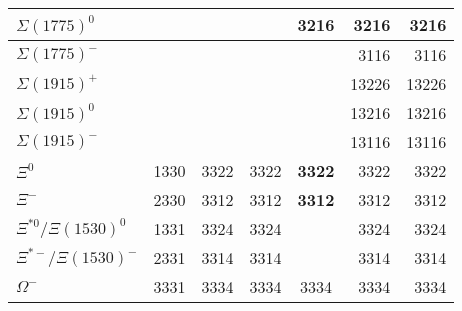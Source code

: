 \begin{tabular}{|l@{\tstrut}|r|r|r|c|r|r|}
$\Sigma(1775)^0$         &       &      &      &  3216 &  3216 & 3216 \\ \hline
$\Sigma(1775)^-$         &       &      &      &       &  3116 & 3116 \\ \hline
$\Sigma(1915)^+$         &       &      &      &       & 13226 & 13226 \\ \hline
$\Sigma(1915)^0$         &       &      &      &       & 13216 & 13216 \\ \hline
$\Sigma(1915)^-$         &       &      &      &       & 13116 & 13116 \\ \hline
$\Xi^0$                  &  1330 & 3322 & 3322 & \bf{3322} &  3322 & 3322 \\ \hline
$\Xi^-$                  &  2330 & 3312 & 3312 & \bf{3312} &  3312 & 3312 \\ \hline
$\Xi^{*0}/\Xi(1530)^0$   &  1331 & 3324 & 3324 &       &  3324 & 3324 \\ \hline
$\Xi^{*-}/\Xi(1530)^-$   &  2331 & 3314 & 3314 &       &  3314 & 3314 \\ \hline
$\Omega^-$               &  3331 & 3334 & 3334 &  3334 &  3334 & 3334 \\ \hline
\end{tabular}

